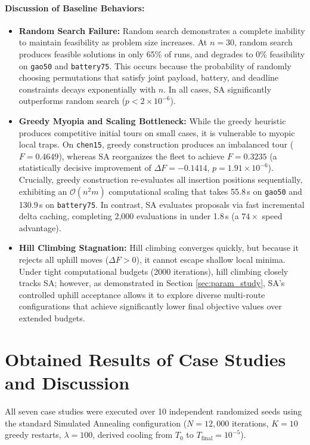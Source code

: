 \paragraph{Discussion of Baseline Behaviors:}
\begin{itemize}
    \item \textbf{Random Search Failure:} Random search demonstrates a complete inability to maintain feasibility as problem size increases. At $n=30$, random search produces feasible solutions in only 65\% of runs, and degrades to 0\% feasibility on \texttt{gao50} and \texttt{battery75}. This occurs because the probability of randomly choosing permutations that satisfy joint payload, battery, and deadline constraints decays exponentially with $n$. In all cases, SA significantly outperforms random search ($p < 2 \times 10^{-6}$).
    \item \textbf{Greedy Myopia and Scaling Bottleneck:} While the greedy heuristic produces competitive initial tours on small cases, it is vulnerable to myopic local traps. On \texttt{chen15}, greedy construction produces an imbalanced tour ($F=0.4649$), whereas SA reorganizes the fleet to achieve $F=0.3235$ (a statistically decisive improvement of $\Delta F = -0.1414$, $p = 1.91 \times 10^{-6}$). Crucially, greedy construction re-evaluates all insertion positions sequentially, exhibiting an $\mathcal{O}(n^2 m)$ computational scaling that takes 55.8\,s on \texttt{gao50} and 130.9\,s on \texttt{battery75}. In contrast, SA evaluates proposals via fast incremental delta caching, completing 2,000 evaluations in under 1.8\,s (a $74\times$ speed advantage).
    \item \textbf{Hill Climbing Stagnation:} Hill climbing converges quickly, but because it rejects all uphill moves ($\Delta F > 0$), it cannot escape shallow local minima. Under tight computational budgets (2000 iterations), hill climbing closely tracks SA; however, as demonstrated in Section \ref{sec:param_study}, SA's controlled uphill acceptance allows it to explore diverse multi-route configurations that achieve significantly lower final objective values over extended budgets.
\end{itemize}

\section{Obtained Results of Case Studies and Discussion}\label{sec:case_study_results}
All seven case studies were executed over 10 independent randomized seeds using the standard Simulated Annealing configuration ($N = 12,000$ iterations, $K = 10$ greedy restarts, $\lambda = 100$, derived cooling from $T_0$ to $T_{\text{final}} = 10^{-5}$). 

